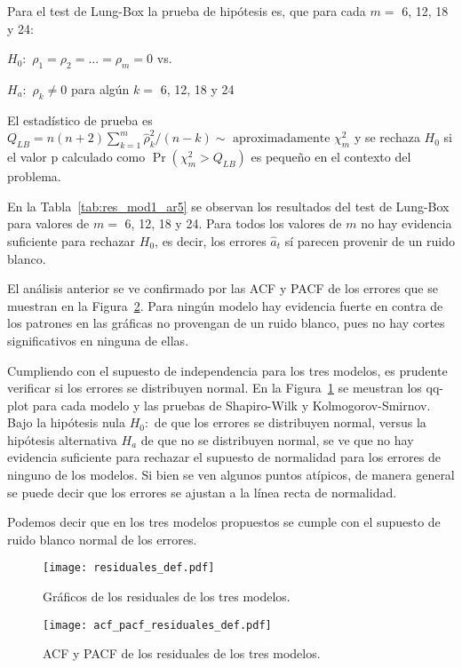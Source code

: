 \documentclass[11pt, letterpaper, twoside]{article}
\begin{document}
Para el test de Lung-Box la prueba de hipótesis es, que para cada $m=$ 6, 12, 18 y 24:

$H_0:$ $\rho_1=\rho_2=...=\rho_m=0$ vs.

$H_a:$ $\rho_k \neq 0$ para algún $k=$ 6, 12, 18 y 24

El estadístico de prueba es $Q_{LB}=n(n+2) \sum_{k=1}^m \hat{\rho}_k^2/(n-k) \sim \text{ aproximadamente } \chi_m^2$ y se rechaza $H_0$ si el valor p calculado como $\Pr(\chi_m^2 >Q_{LB})$ es pequeño en el contexto del problema.

En la Tabla~\ref{tab:res_mod1_ar5} se observan los resultados del test de Lung-Box para valores de $m=$ 6, 12, 18 y 24. Para todos los valores de $m$ no hay evidencia suficiente para rechazar $H_0$, es decir, los errores $\hat{a}_t$ sí parecen provenir de un ruido blanco.

El análisis anterior se ve confirmado por las ACF y PACF de los errores que se muestran en la Figura~\ref{fig:acf_pacf_residuales_def}. Para ningún modelo hay evidencia fuerte en contra de los patrones en las gráficas no provengan de un ruido blanco, pues no hay cortes significativos en ninguna de ellas.

Cumpliendo con el supuesto de independencia para los tres modelos, es prudente verificar si los errores se distribuyen normal. En la Figura~\ref{fig:residuales_def} se meustran los qq-plot para cada modelo  y las pruebas de Shapiro-Wilk y Kolmogorov-Smirnov. Bajo la hipótesis nula $H_0:$ de que los errores se distribuyen normal, versus la hipótesis alternativa $H_a$ de que no se distribuyen normal, se ve que no hay evidencia suficiente para rechazar el supuesto de normalidad para los errores de ninguno de los modelos. Si bien se ven algunos puntos atípicos, de manera general se puede decir que los errores se ajustan a la línea recta de normalidad.

Podemos decir que en los tres modelos propuestos se cumple con el supuesto de ruido blanco normal de los errores.

\begin{figure}[ht!]
\centering
\texttt{[image: residuales\_def.pdf]}
\caption{Gráficos de los residuales de los tres modelos.}
\label{fig:residuales_def}
\end{figure}

\begin{figure}[ht!]
\centering
\texttt{[image: acf\_pacf\_residuales\_def.pdf]}
\caption{ACF y PACF de los residuales de los tres modelos.}
\label{fig:acf_pacf_residuales_def}
\end{figure}
\end{document}
